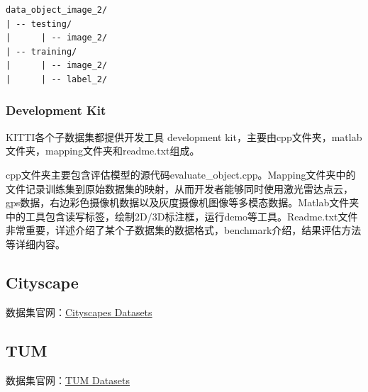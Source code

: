 \begin{verbatim}
data_object_image_2/
| -- testing/
|      | -- image_2/
| -- training/
|      | -- image_2/
|      | -- label_2/
\end{verbatim}

\subsubsection{Development Kit}

KITTI各个子数据集都提供开发工具 development kit，主要由cpp文件夹，matlab文件夹，mapping文件夹和readme.txt组成。

cpp文件夹主要包含评估模型的源代码evaluate\_object.cpp。Mapping文件夹中的文件记录训练集到原始数据集的映射，从而开发者能够同时使用激光雷达点云，gps数据，右边彩色摄像机数据以及灰度摄像机图像等多模态数据。Matlab文件夹中的工具包含读写标签，绘制2D/3D标注框，运行demo等工具。Readme.txt文件非常重要，详述介绍了某个子数据集的数据格式，benchmark介绍，结果评估方法等详细内容。

\subsection{Cityscape}

数据集官网：\href{https://www.cityscapes-dataset.com/}{Cityscapes Datasets}



\subsection{TUM}

数据集官网：\href{https://vision.in.tum.de/data/datasets}{TUM Datasets}

























